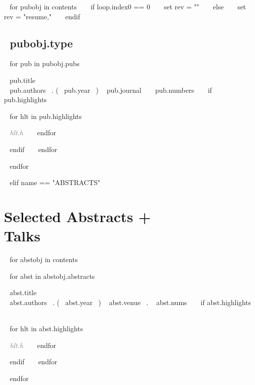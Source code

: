 ~{ for pubobj in contents }~ 
~{ if loop.index0 == 0 }~ 
	~{ set rev = "" }~
~{ else }~
	~{ set rev = "resume," }~
~{ endif }~
\subsection{~{{pubobj.type}}~} 
\begin{etaremune}[~{{ rev }}~itemindent=-1.5\bibhang, topsep=0pt,
				   itemsep=\bibsep,partopsep=0pt,parsep=0pt,leftmargin={\bibhang+\widthof{[999]}}] 
    ~{ for pub in pubobj.pubs  }~
    \item ~{{ pub.title }}~ \\
     ~{{ pub.authors }}~. (~{{ pub.year }}~) ~{{ pub.journal }}~ ~{{ pub.numbers }}~
     ~{ if pub.highlights }~
     	\begin{innerlist}
     	~{ for hlt in pub.highlights }~
	     \item  \textcolor{grey}{\textit{~{{ hlt.h }}~} }
     	~{ endfor }~
     	\end{innerlist}
     ~{ endif }~
	~{ endfor }~

\end{etaremune}

~{ endfor }~





~{ elif name == "ABSTRACTS" }~

\section{Selected Abstracts +  \\Talks}

~{ for abstobj in contents }~ 
\begin{etaremune}[itemindent=-1.5\bibhang, topsep=0pt,
				   itemsep=\bibsep,partopsep=0pt,parsep=0pt,leftmargin={\bibhang+\widthof{[999]}}] 
    ~{ for abst in abstobj.abstracts  }~
    \item ~{{ abst.title }}~\\ ~{{ abst.authors }}~. (~{{ abst.year }}~) ~{{ abst.venue }}~. ~{{ abst.nums }}~
     ~{ if abst.highlights }~
     	\begin{innerlist}
     	~{ for hlt in abst.highlights }~
	     \item  \textcolor{grey}{\textit{~{{ hlt.h }}~} }
     	~{ endfor }~
     	\end{innerlist}
     ~{ endif }~
	~{ endfor }~


\end{etaremune}
~{ endfor }~



